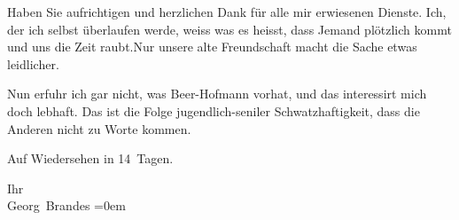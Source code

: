 \pstart
           Haben Sie aufrichtigen und herzlichen Dank für alle mir erwiesenen Dienste. Ich, der
               ich selbst überlaufen werde, weiss {\pb}was es heisst, dass Jemand plötzlich kommt und uns die Zeit raubt.\hspace*{1.5em}Nur unsere alte Freundschaft macht die Sache etwas
               leidlicher.\pend
           
\pstart
           Nun erfuhr ich gar nicht, was Beer-Hofmann
               vorhat, und das interessirt mich doch lebhaft. Das ist die Folge jugendlich-seniler
               Schwatzhaftigkeit, dass die Anderen nicht zu Worte kommen.\pend
           
\pstart
           Auf Wiedersehen in 14 Tagen.\pend
           
\pstart
           Ihr{\\[\baselineskip]}\spacefill\mbox{Georg Brandes}\pend
           \leftskip=0em{}\endnumbering{}  \newcommand{\dateiname}{L01121}\newcommand{\titel}{Georg Brandes an Arthur Schnitzler, 17. 5. 1901}\newcommand{\editorInnen}{Martin Anton Müller und Gerd-Hermann Susen}
